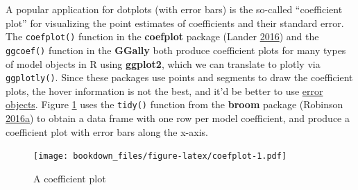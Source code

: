 \documentclass[12pt,]{isuthesis}
\newenvironment{Shaded}{\begin{snugshade}}{\end{snugshade}}
\newcommand{\KeywordTok}[1]{\textcolor[rgb]{0.13,0.29,0.53}{\textbf{{#1}}}}
\newcommand{\DataTypeTok}[1]{\textcolor[rgb]{0.13,0.29,0.53}{{#1}}}
\newcommand{\DecValTok}[1]{\textcolor[rgb]{0.00,0.00,0.81}{{#1}}}
\newcommand{\StringTok}[1]{\textcolor[rgb]{0.31,0.60,0.02}{{#1}}}
\newcommand{\CommentTok}[1]{\textcolor[rgb]{0.56,0.35,0.01}{\textit{{#1}}}}
\newcommand{\NormalTok}[1]{{#1}}
\begin{document}
A popular application for dotplots (with error bars) is the so-called
``coefficient plot'' for visualizing the point estimates of coefficients
and their standard error. The \texttt{coefplot()} function in the
\textbf{coefplot} package (Lander
\protect\hyperlink{ref-coefplot}{2016}) and the \texttt{ggcoef()}
function in the \textbf{GGally} both produce coefficient plots for many
types of model objects in R using \textbf{ggplot2}, which we can
translate to plotly via \texttt{ggplotly()}. Since these packages use
points and segments to draw the coefficient plots, the hover information
is not the best, and it'd be better to use
\href{https://plot.ly/r/reference/\#scatter-error_x}{error objects}.
Figure \ref{fig:coefplot} uses the \texttt{tidy()} function from the
\textbf{broom} package (Robinson
\protect\hyperlink{ref-broom}{2016}\protect\hyperlink{ref-broom}{a}) to
obtain a data frame with one row per model coefficient, and produce a
coefficient plot with error bars along the x-axis.

\begin{Shaded}
\end{Shaded}

\begin{figure}[htbp]
\centering
\texttt{[image: bookdown\_files/figure-latex/coefplot-1.pdf]}
\caption{\label{fig:coefplot}A coefficient plot}
\end{figure}
\end{document}
